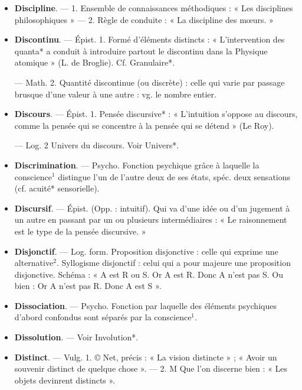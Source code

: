 \begin{itemize}[leftmargin=1cm, label=, itemsep=1pt]
\item {\bf Discipline}. — 1. Ensemble de connaissances méthodiques : « Les
disciplines philosophiques » — 2.
Règle de conduite : « La discipline
des mœurs. »

\item {\bf Discontinu}. — Épist. 1. Formé d'éléments distincts : « L'intervention
des quanta* a conduit à introduire
partout le discontinu dans la Physique atomique » (L. de Broglie). Cf.
Granulaire*.

— Math. 2. Quantité discontinue
(ou discrète) : celle qui varie par passage brusque d’une valeur à une
autre : vg. le nombre entier.

\item {\bf Discours}. — Épist. 1. Pensée discursive* : « L'intuition s'oppose au discours, comme la pensée qui se concentre à la pensée qui se détend »
(Le Roy).

— Log. 2 Univers du discours.
Voir Univers*.

\item {\bf Discrimination}. — Psycho. Fonction
psychique grâce à laquelle la conscience$^1$ distingue l’un de l'autre
deux de ses états, spéc. deux sensations (cf. acuité* sensorielle).

\item {\bf Discursif}. — Épist. (Opp. : intuitif).
Qui va d’une idée ou d'un jugement
à un autre en passant par un ou plusieurs intermédiaires : « Le raisonnement est le type de la pensée
discursive. »

\item {\bf Disjonctif}. — Log. form. Proposition
disjonctive : celle qui exprime une
alternative$^2$. Syllogisme disjonctif :
celui qui a pour majeure une proposition disjonctive. Schéma : « A
est R ou S. Or A est R. Donc A n'est
pas S. Ou bien : Or A n’est pas R.
Donc A est S ».

\item {\bf Dissociation}. — Psycho. Fonction par
laquelle des éléments psychiques
d’abord confondus sont séparés par
la conscience$^1$.

\item {\bf Dissolution}. — Voir Involution*.

\item {\bf Distinct}. — Vulg. 1. © Net, précis :
« La vision distincte » ; « Avoir un
souvenir distinct de quelque chose ».
— 2. M Que l’on discerne bien :
« Les objets devinrent distincts ».


\end{itemize}
